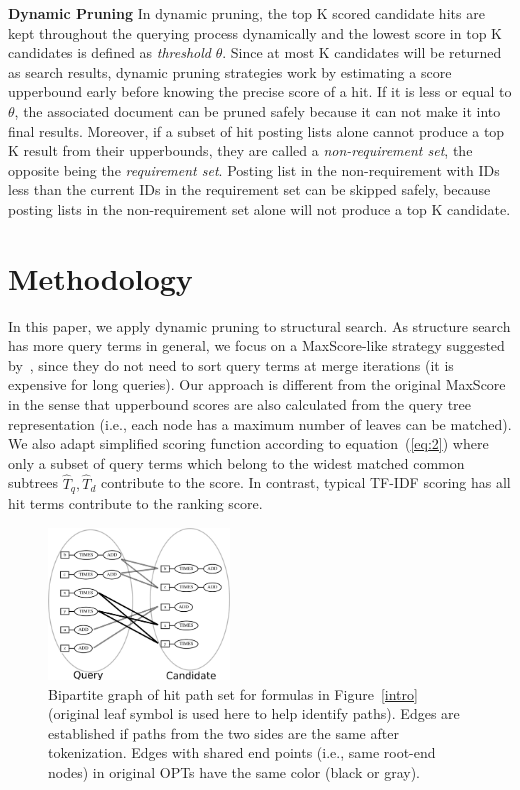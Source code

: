\documentclass[runningheads]{llncs}
\begin{document}
\vspace{0.1in}
\noindent\textbf{Dynamic Pruning}\; In dynamic pruning, the top K scored candidate hits are kept throughout the querying process dynamically and the lowest score in top K candidates is defined as \textit{threshold} $\theta$. Since at most K candidates will be returned as search results, dynamic pruning strategies work by estimating a score upperbound early before knowing the precise score of a hit.
%
If it is less or equal to $\theta$, the associated document can be pruned safely because it can not make it into final results.
Moreover, if a subset of hit posting lists alone cannot produce a top K result from their upperbounds, they are called a \textit{non-requirement set}, the opposite being the \textit{requirement set}.
%
Posting list in the non-requirement with IDs less than the current IDs in the requirement set can be skipped safely, because posting lists in the non-requirement set alone will not produce a top K candidate.

\section{Methodology}
\label{strategy}
In this paper, we apply dynamic pruning to structural search.
As structure search has more query terms in general, we focus on a MaxScore-like strategy suggested by~\cite{Shandongdong2012, antonio2019}, since they do not need to sort query terms at merge iterations (it is expensive for long queries).
%
Our approach is different from the original MaxScore in the sense that upperbound scores are also calculated from the query tree representation (i.e., each node has a maximum number of leaves can be matched).
We also adapt simplified scoring function according to equation~(\ref{eq:2})
where only a subset of query terms which belong to the widest matched common subtrees $\hat{T}_q, \hat{T}_d$ contribute to the score.
In contrast, typical TF-IDF scoring has all hit terms contribute to the ranking score.

\begin{figure}[!t]
\begin{center}
\includegraphics[width=1.90in]{fig/bipartile.eps}
\caption{Bipartite graph of hit path set for formulas in Figure~\ref{intro} (original leaf symbol is used here to help identify paths). Edges are established if paths from the two sides are the same after tokenization. Edges with shared end points (i.e., same root-end nodes) in original OPTs have the same color (black or gray). }
\label{bipart}
\end{center}
\end{figure}
\end{document}
